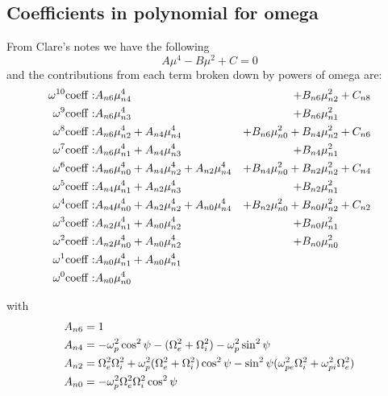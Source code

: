 \documentclass[]{article}
\begin{document}
\subsection{Coefficients in polynomial for omega}
From Clare's notes we have the following
\[ A \mu^4 - B \mu^2 + C = 0\]
and the contributions from each term broken down by powers of omega are:
\begin{align}
\omega^{10} \mathrm{coeff} :& A_{n6}\mu_{n4}^4 
&+ B_{n6}\mu_{n2}^2 
&+  C_{n8}\notag\\
\omega^{9} \mathrm{coeff} :& A_{n6}\mu_{n3}^4 
&+ B_{n6}\mu_{n1}^2
&\notag\\
\omega^{8} \mathrm{coeff} :& A_{n6}\mu_{n2}^4 + A_{n4}\mu_{n4}^4 
&+ B_{n6}\mu_{n0}^2+ B_{n4}\mu_{n2}^2 
&+  C_{n6}\notag\\
\omega^{7} \mathrm{coeff} :& A_{n6}\mu_{n1}^4 + A_{n4}\mu_{n3}^4 
&+ B_{n4}\mu_{n1}^2
& \notag\\
\omega^{6} \mathrm{coeff} :& A_{n6}\mu_{n0}^4 + A_{n4}\mu_{n2}^4 + A_{n2}\mu_{n4}^4 
&+ B_{n4}\mu_{n0}^2 + B_{n2}\mu_{n2}^2 
&+  C_{n4}\notag\\
\omega^{5} \mathrm{coeff} :& A_{n4}\mu_{n1}^4 + A_{n2}\mu_{n3}^4 
&+ B_{n2}\mu_{n1}^2
& \notag\\
\omega^{4} \mathrm{coeff} :& A_{n4}\mu_{n0}^4 + A_{n2}\mu_{n2}^4 + A_{n0}\mu_{n4}^4 
&+ B_{n2}\mu_{n0}^2 + B_{n0}\mu_{n2}^2 
&+  C_{n2}\notag\\
\omega^{3} \mathrm{coeff} :& A_{n2}\mu_{n1}^4 + A_{n0}\mu_{n2}^4 
&+ B_{n0}\mu_{n1}^2&\notag\\
\omega^{2} \mathrm{coeff} :& A_{n2}\mu_{n0}^4 + A_{n0}\mu_{n2}^4 
&+ B_{n0}\mu_{n0}^2&\notag\\
\omega^{1} \mathrm{coeff} :& A_{n0}\mu_{n1}^4 + A_{n0}\mu_{n1}^4
&&\notag\\
\omega^{0} \mathrm{coeff} :& A_{n0}\mu_{n0}^4
&&\notag
\end{align}

with
\begin{align}
A_{n6} &=  1\notag\\
A_{n4} &= -\omega_p^2 \cos^2\psi - (\Omega_e^2 + \Omega_i^2) - \omega_p^2\sin^2 \psi \notag\\
A_{n2} &= \Omega_e^2\Omega_i^2 + \omega_p^2 (\Omega_e^2 +\Omega_i^2)\cos^2\psi - \sin^2 \psi (\omega_{pe}^2\Omega_i^2 + \omega_{pi}^2\Omega_e^2) \notag\\
A_{n0} &= -\omega_p^2\Omega_e^2 \Omega_i^2 \cos^2 \psi
\end{align}
\end{document}
